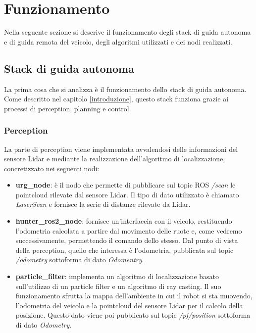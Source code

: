 \chapter{Funzionamento}
Nella seguente sezione si descrive il funzionamento degli stack di guida autonoma e di guida remota del veicolo, degli algoritmi utilizzati e dei nodi realizzati.

\section{Stack di guida autonoma}
La prima cosa che si analizza è il funzionamento dello stack di guida autonoma. Come descritto nel capitolo \ref{introduzione}, questo stack funziona grazie ai processi di perception, planning e control. 

\subsection{Perception} \label{funzionamento_autonomo_perception}
La parte di perception viene implementata avvalendosi delle informazioni del sensore Lidar e mediante la realizzazione dell'algoritmo di localizzazione, concretizzato nei seguenti nodi:
\begin{itemize}
  \item \textbf{urg\_node}: è il nodo che permette di pubblicare sul topic ROS \textit{/scan} le pointcloud rilevate dal sensore Lidar. Il tipo di dato utilizzato è chiamato \textit{LaserScan} e fornisce la serie di distanze rilevate da Lidar.
  
  \item \textbf{hunter\_ros2\_node}: fornisce un'interfaccia con il veicolo, restituendo l'odometria calcolata a partire dal movimento delle ruote e, come vedremo successivamente, permettendo il comando dello stesso. Dal punto di vista della perception, quello che interessa è l'odometria, pubblicata sul topic \textit{/odometry} sottoforma di dato \textit{Odomentry}. 
  
  \item \textbf{particle\_filter}: implementa un algoritmo di localizzazione basato sull'utilizzo di un particle filter e un algoritmo di ray casting. Il suo funzionamento sfrutta la mappa dell'ambiente in cui il robot si sta muovendo, l'odometria del veicolo e la pointcloud del sensore Lidar per il calcolo della posizione. Questo dato viene poi pubblicato sul topic \textit{/pf/position} sottoforma di dato \textit{Odometry}.
\end{itemize}

